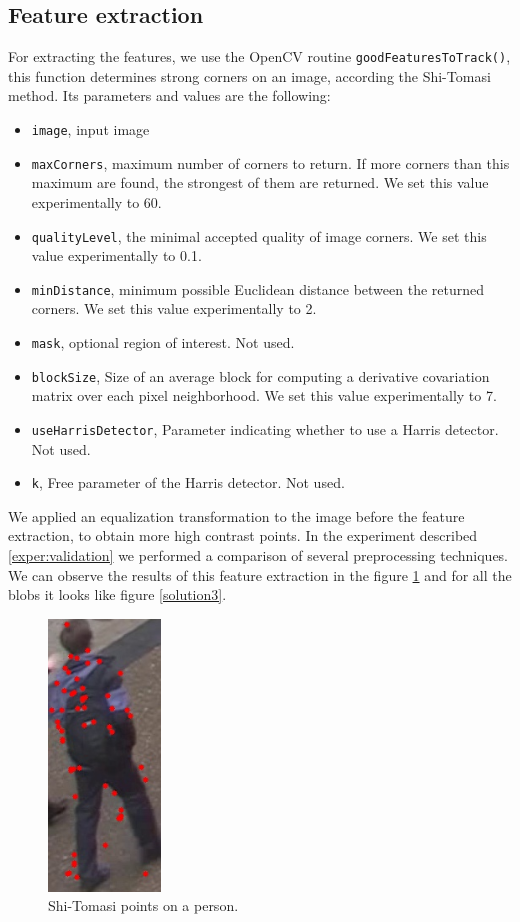 \subsection{Feature extraction}

For extracting the features, we use the OpenCV routine \texttt{goodFeaturesToTrack()}, this function determines strong corners on an image, according the Shi-Tomasi method. Its parameters and values are the following:
 
\begin{itemize}

\item \texttt{image}, input image

\item \texttt{maxCorners}, maximum number of corners to return. If more corners than this maximum are found, the strongest of them are returned. We set this value experimentally to 60.
\item \texttt{qualityLevel}, the minimal accepted quality of image corners. We set this value experimentally to 0.1.
\item \texttt{minDistance}, minimum possible Euclidean distance between the returned corners. We set this value experimentally to 2.
\item \texttt{mask}, optional region of interest. Not used.
\item \texttt{blockSize}, Size of an average block for computing a derivative covariation matrix over each pixel neighborhood. We set this value experimentally to 7.
\item \texttt{useHarrisDetector},  Parameter indicating whether to use a Harris detector. Not used.
\item \texttt{k},  Free parameter of the Harris detector. Not used.

\end{itemize}

We applied an equalization transformation to the image before the feature extraction, to obtain more high contrast points. In the experiment described \ref{exper:validation} we performed a comparison of several preprocessing techniques. We can observe the results of this feature extraction in the figure \ref{solution2} and for all the blobs it looks like figure \ref{solution3}.


\begin{figure}[H]
\centering         
\includegraphics[width=3cm]{implementation/pointsEQU.jpg}
\caption{Shi-Tomasi points on a person.} \label{solution2}
\end{figure}


